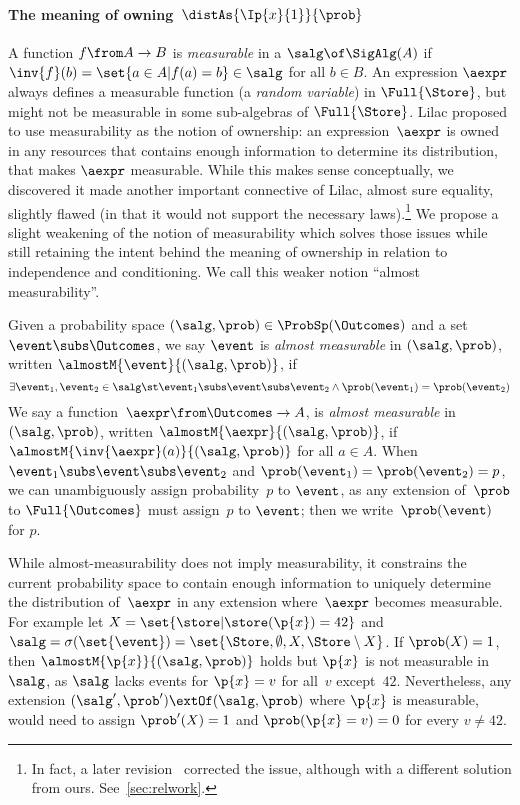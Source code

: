\documentclass[acmsmall,nonacm,screen,appendix]{acmart}
\begin{document}
\paragraph{The meaning of owning~$ \distAs{\Ip{x}{1}}{\prob} $}
A function $ f \from A \to B $ is \emph{measurable} in a \salgebra{}
$ \salg \of \SigAlg(A) $ if $ \inv{f}(b) = \set{a \in A | f(a) = b} \in \salg $
for all $b\in B$.
An expression $\aexpr$ always defines a measurable function
(\ie a \emph{random variable})
in $\Full{\Store}$,
but might not be measurable in some sub-algebras of $\Full{\Store}$.
Lilac proposed to use measurability as the notion of ownership:
an expression~$\aexpr$ is owned in any resources that contains enough
information to determine its distribution, \ie that makes $\aexpr$ measurable.
While this makes sense conceptually,
we discovered it made another important connective of Lilac,
almost sure equality, slightly flawed
(in that it would not support the necessary laws).\footnote{In fact, a later revision~\cite{lilac2} corrected the issue,
  although with a different solution from ours.
  See~\cref{sec:relwork}.}
We propose a slight weakening of the notion of measurability which solves
those issues while still retaining the intent behind the meaning of ownership in relation to independence and conditioning.
We call this weaker notion ``almost measurability''.

\begin{definition}
  \label{def:almost-meas}
  Given a probability space $ (\salg,\prob) \in \ProbSp(\Outcomes) $
  and a set $\event \subs \Outcomes$,
  we say $ \event $ is \emph{almost measurable} in $(\salg, \prob)$,
  written $ \almostM{\event}{(\salg, \prob)} $,
  if \[
    \exists \event_1,\event_2 \in \salg \st
    \event_1 \subs \event \subs \event_2
    \land
    \prob(\event_1)=\prob(\event_2)
  \]
  We say a function~$ \aexpr \from \Outcomes \to A $,
  is \emph{almost measurable} in $(\salg, \prob)$,
  written $ \almostM{\aexpr}{(\salg, \prob)} $,
  if $
  {\almostM{\inv{\aexpr}(a)}{(\salg, \prob)}}
  $
  for all $a \in A$.
When
  $ \event_1 \subs \event \subs \event_2$
  and
  $ \prob(\event_1)=\prob(\event_2)=p $,
  we can unambiguously assign probability~$p$ to $\event$,
  as any extension of~$\prob$ to $\Full{\Outcomes}$ must
  assign~$p$ to $\event$;
  then we write~$\prob(\event)$ for $p$.
\end{definition}

While almost-measurability does not imply measurability,
it constrains the current probability space to contain enough information
to uniquely determine the distribution of~$\aexpr$ in any
extension where~$\aexpr$ becomes measurable.
For example let $X=\set{\store | \store(\p{x}) = 42}$ and
$ \salg = \sigma(\set{\event}) = \set{\Store,\emptyset,X,\Store\setminus X}$.
If $ \prob(X) = 1 $, then $ \almostM{\p{x}}{(\salg,\prob)} $
holds but $\p{x}$ is not measurable in~$\salg$, as $\salg$ lacks events
for $\p{x}=v$ for all~$v$ except~$42$.
Nevertheless, any extension $(\salg',\prob') \extOf (\salg,\prob)$
where $\p{x}$ is measurable,
would need to assign $\prob'(X) = 1$ and
$\prob(\p{x}=v) = 0$ for every $v \ne 42$.
\end{document}
